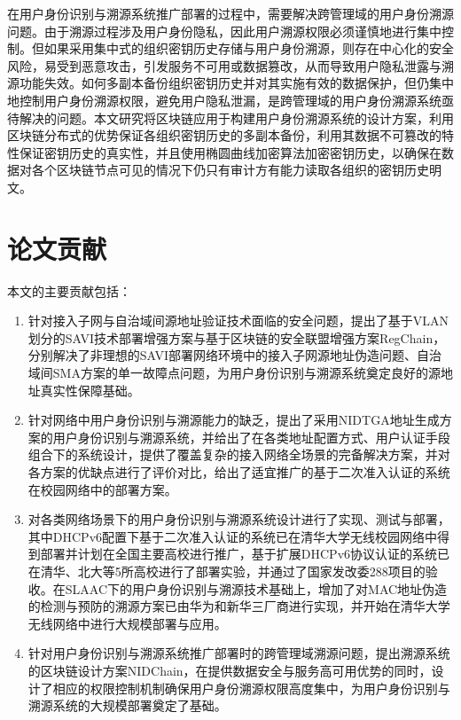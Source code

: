 \begin{enumerate}[1{)}]
    在用户身份识别与溯源系统推广部署的过程中，需要解决跨管理域的用户身份溯源问题。由于溯源过程涉及用户身份隐私，因此用户溯源权限必须谨慎地进行集中控制。但如果采用集中式的组织密钥历史存储与用户身份溯源，则存在中心化的安全风险，易受到恶意攻击，引发服务不可用或数据篡改，从而导致用户隐私泄露与溯源功能失效。如何多副本备份组织密钥历史并对其实施有效的数据保护，但仍集中地控制用户身份溯源权限，避免用户隐私泄漏，是跨管理域的用户身份溯源系统亟待解决的问题。本文研究将区块链应用于构建用户身份溯源系统的设计方案，利用区块链分布式的优势保证各组织密钥历史的多副本备份，利用其数据不可篡改的特性保证密钥历史的真实性，并且使用椭圆曲线加密算法加密密钥历史，以确保在数据对各个区块链节点可见的情况下仍只有审计方有能力读取各组织的密钥历史明文。

  \end{enumerate}


  \section{论文贡献}
  \label{introduction:contribution}
  本文的主要贡献包括：
  \begin{enumerate}[1{)}]
    \item 针对接入子网与自治域间源地址验证技术面临的安全问题，提出了基于VLAN划分的SAVI技术部署增强方案与基于区块链的安全联盟增强方案RegChain，分别解决了非理想的SAVI部署网络环境中的接入子网源地址伪造问题、自治域间SMA方案的单一故障点问题，为用户身份识别与溯源系统奠定良好的源地址真实性保障基础。
    \item 针对网络中用户身份识别与溯源能力的缺乏，提出了采用NIDTGA地址生成方案的用户身份识别与溯源系统，并给出了在各类地址配置方式、用户认证手段组合下的系统设计，提供了覆盖复杂的接入网络全场景的完备解决方案，并对各方案的优缺点进行了评价对比，给出了适宜推广的基于二次准入认证的系统在校园网络中的部署方案。
    \item 对各类网络场景下的用户身份识别与溯源系统设计进行了实现、测试与部署，其中DHCPv6配置下基于二次准入认证的系统已在清华大学无线校园网络中得到部署并计划在全国主要高校进行推广，基于扩展DHCPv6协议认证的系统已在清华、北大等5所高校进行了部署实验，并通过了国家发改委288项目的验收。在SLAAC下的用户身份识别与溯源技术基础上，增加了对MAC地址伪造的检测与预防的溯源方案已由华为和新华三厂商进行实现，并开始在清华大学无线网络中进行大规模部署与应用。
    \item 针对用户身份识别与溯源系统推广部署时的跨管理域溯源问题，提出溯源系统的区块链设计方案NIDChain，在提供数据安全与服务高可用优势的同时，设计了相应的权限控制机制确保用户身份溯源权限高度集中，为用户身份识别与溯源系统的大规模部署奠定了基础。
  \end{enumerate}


